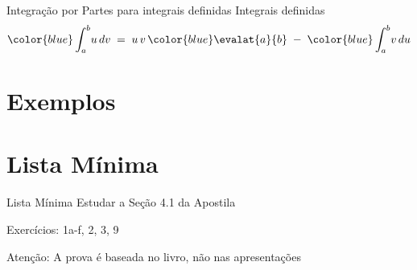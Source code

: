 \documentclass[fleqn,utf8,aspectratio=169,12pt]{beamer}
\begin{document}
\begin{frame}{Integração por Partes para integrais definidas}
  Integrais definidas
  {\large
  \[
    {\color{blue}\int_a^b} u\, dv
    \;=\; u\,v\, {\color{blue}\evalat{a}{b}}
    \;-\; {\color{blue}\int_a^b} v\,du
  \]}
\end{frame}

\section{Exemplos}











\section{Lista Mínima}

\begin{frame}{Lista Mínima}
  Estudar a Seção 4.1 da Apostila

  Exercícios: 1a-f, 2, 3, 9

  \vfill
  Atenção: A prova é baseada no livro, não nas apresentações
\end{frame}

\end{document}
